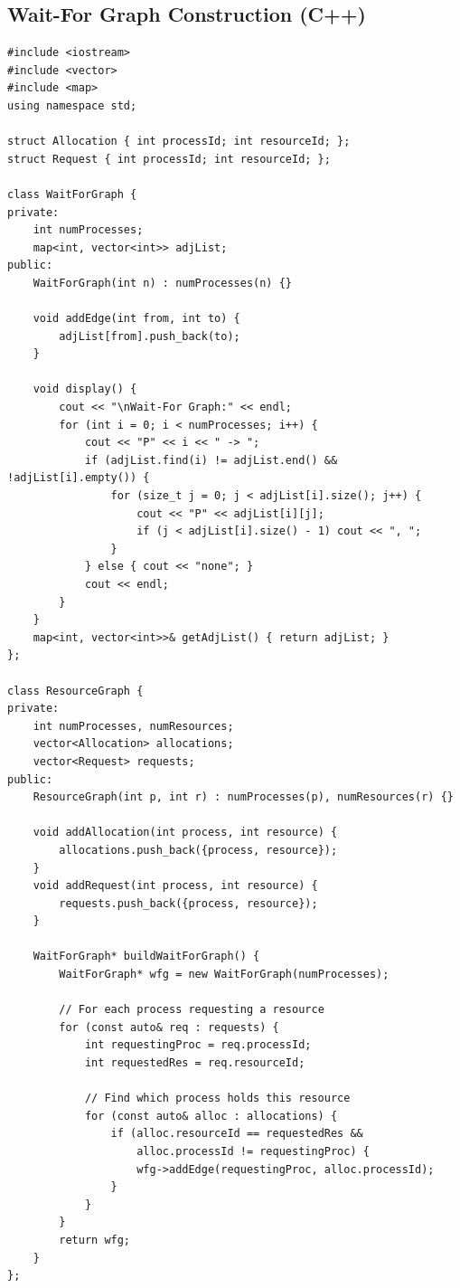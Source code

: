 \documentclass[a4paper,10pt,oneside]{article}
\begin{document}
\begin{multicols*}{\COLS}
\subsection*{Wait-For Graph Construction (C++)}
\begin{lstlisting}
#include <iostream>
#include <vector>
#include <map>
using namespace std;

struct Allocation { int processId; int resourceId; };
struct Request { int processId; int resourceId; };

class WaitForGraph {
private:
    int numProcesses;
    map<int, vector<int>> adjList;
public:
    WaitForGraph(int n) : numProcesses(n) {}
    
    void addEdge(int from, int to) {
        adjList[from].push_back(to);
    }
    
    void display() {
        cout << "\nWait-For Graph:" << endl;
        for (int i = 0; i < numProcesses; i++) {
            cout << "P" << i << " -> ";
            if (adjList.find(i) != adjList.end() && !adjList[i].empty()) {
                for (size_t j = 0; j < adjList[i].size(); j++) {
                    cout << "P" << adjList[i][j];
                    if (j < adjList[i].size() - 1) cout << ", ";
                }
            } else { cout << "none"; }
            cout << endl;
        }
    }
    map<int, vector<int>>& getAdjList() { return adjList; }
};

class ResourceGraph {
private:
    int numProcesses, numResources;
    vector<Allocation> allocations;
    vector<Request> requests;
public:
    ResourceGraph(int p, int r) : numProcesses(p), numResources(r) {}
    
    void addAllocation(int process, int resource) {
        allocations.push_back({process, resource});
    }
    void addRequest(int process, int resource) {
        requests.push_back({process, resource});
    }
    
    WaitForGraph* buildWaitForGraph() {
        WaitForGraph* wfg = new WaitForGraph(numProcesses);
        
        // For each process requesting a resource
        for (const auto& req : requests) {
            int requestingProc = req.processId;
            int requestedRes = req.resourceId;
            
            // Find which process holds this resource
            for (const auto& alloc : allocations) {
                if (alloc.resourceId == requestedRes && 
                    alloc.processId != requestingProc) {
                    wfg->addEdge(requestingProc, alloc.processId);
                }
            }
        }
        return wfg;
    }
};


\end{lstlisting}
\end{multicols*}
\end{document}
